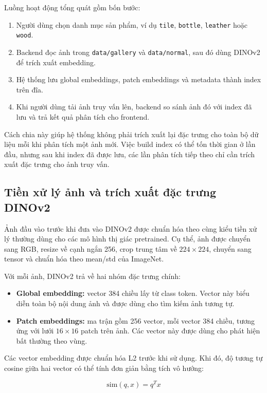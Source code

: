 Luồng hoạt động tổng quát gồm bốn bước:

\begin{enumerate}
    \item Người dùng chọn danh mục sản phẩm, ví dụ \texttt{tile}, \texttt{bottle}, \texttt{leather} hoặc \texttt{wood}.
    \item Backend đọc ảnh trong \texttt{data/gallery} và \texttt{data/normal}, sau đó dùng DINOv2 để trích xuất embedding.
    \item Hệ thống lưu global embeddings, patch embeddings và metadata thành index trên đĩa.
    \item Khi người dùng tải ảnh truy vấn lên, backend so sánh ảnh đó với index đã lưu và trả kết quả phân tích cho frontend.
\end{enumerate}

Cách chia này giúp hệ thống không phải trích xuất lại đặc trưng cho toàn bộ dữ liệu mỗi khi phân tích một ảnh mới. Việc build index có thể tốn thời gian ở lần đầu, nhưng sau khi index đã được lưu, các lần phân tích tiếp theo chỉ cần trích xuất đặc trưng cho ảnh truy vấn.

\subsection{Tiền xử lý ảnh và trích xuất đặc trưng DINOv2}
Ảnh đầu vào trước khi đưa vào DINOv2 được chuẩn hóa theo cùng kiểu tiền xử lý thường dùng cho các mô hình thị giác pretrained. Cụ thể, ảnh được chuyển sang RGB, resize về cạnh ngắn 256, crop trung tâm về $224 \times 224$, chuyển sang tensor và chuẩn hóa theo mean/std của ImageNet.

Với mỗi ảnh, DINOv2 trả về hai nhóm đặc trưng chính:

\begin{itemize}
    \item \textbf{Global embedding:} vector 384 chiều lấy từ class token. Vector này biểu diễn toàn bộ nội dung ảnh và được dùng cho tìm kiếm ảnh tương tự.
    \item \textbf{Patch embeddings:} ma trận gồm 256 vector, mỗi vector 384 chiều, tương ứng với lưới $16 \times 16$ patch trên ảnh. Các vector này được dùng cho phát hiện bất thường theo vùng.
\end{itemize}

Các vector embedding được chuẩn hóa L2 trước khi sử dụng. Khi đó, độ tương tự cosine giữa hai vector có thể tính đơn giản bằng tích vô hướng:

\[
\text{sim}(q, x) = q^T x
\]

